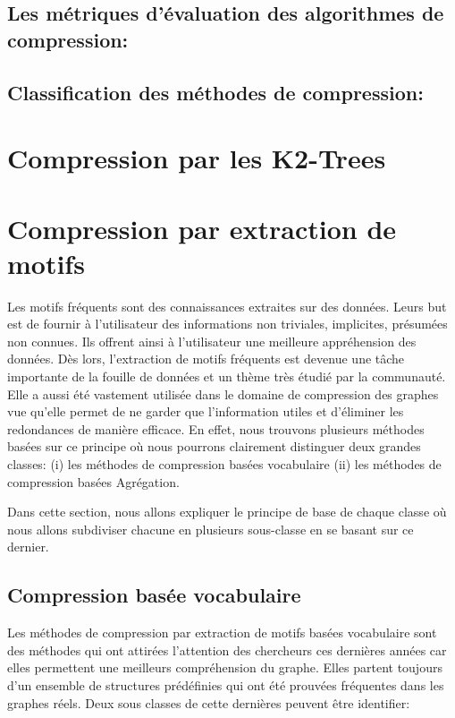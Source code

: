 \documentclass[a4paper,oneside,12pt]{report}
\theoremstyle{definition}
\begin{document}
	
			\subsection{Les métriques d'évaluation des algorithmes de compression:}
				
			
			\subsection{Classification des méthodes de compression:}
				
				
			\section{Compression par les K2-Trees}
				
				
			\section{Compression par extraction de motifs}
			 Les motifs fréquents sont des connaissances extraites sur des données. Leurs but est de fournir à l'utilisateur des informations non triviales, implicites, présumées non connues. Ils offrent ainsi à l'utilisateur une meilleure appréhension des données. Dès lors, l'extraction de motifs fréquents est  devenue une tâche importante de la fouille de données et un thème très étudié par la communauté. Elle a aussi été vastement%
			 utilisée dans le domaine de compression des graphes vue qu'elle permet de ne garder que l'information utiles et d'éliminer les redondances de manière efficace. En effet, nous trouvons plusieurs méthodes basées sur ce principe où nous pourrons clairement distinguer deux grandes classes: 
			 (i) les méthodes  de compression basées vocabulaire
			 (ii) les méthodes  de compression basées Agrégation.
			 
				Dans cette section, nous allons expliquer le principe de base de chaque classe où nous allons subdiviser chacune  en plusieurs sous-classe en se basant sur ce dernier. 
			 
				\subsection{Compression basée vocabulaire}
				Les méthodes de compression par extraction de motifs basées vocabulaire sont des méthodes qui ont attirées l'attention des chercheurs ces dernières années car elles permettent une meilleurs compréhension du graphe. Elles partent toujours d'un ensemble de structures prédéfinies qui ont été prouvées fréquentes dans les graphes réels. Deux sous classes de cette dernières peuvent être identifier:
				 
\end{document}
